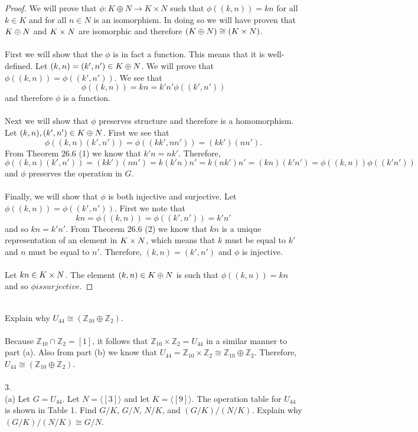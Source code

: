 \documentclass[11pt]{article}
\begin{document}
\begin{proof}
We will prove that $\phi: K \oplus N \rightarrow K \times N$ such that $\phi((k,n)) = kn$ for all $k\in K$ and for all $n\in N$ is an isomorphism. In doing so we will have proven that $K \oplus N$ and $K \times N$ are isomorphic and therefore $ (K \oplus N) \cong (K \times N) $.\\
~\\
First we will show that the $\phi$ is in fact a function. This means that it is well-defined. Let $(k,n) = (k',n') \in K \oplus N$. We will prove that $\phi((k,n)) = \phi((k',n'))$. We see that
\[ \phi((k,n)) = kn = k'n' \phi((k',n')) \]
and therefore $\phi$ is a function.\\
~\\
Next we will show that $\phi$ preserves structure and therefore is a homomorphism. Let $(k,n),(k',n')\in K \oplus N$. First we see that 
\[ \phi((k,n)(k',n')) = \phi((kk',nn')) = (kk')(nn'). \]
From Theorem 26.6 (1) we know that $k'n=nk'$. Therefore,
\[ \phi((k,n)(k',n')) = (kk')(nn') = k(k'n)n' = k(nk')n' = (kn)(k'n') = \phi((k,n))\phi((k'n')) \]
and $\phi$ preserves the operation in $G$.\\
~\\
Finally, we will show that $\phi$ is both injective and surjective. Let $\phi((k,n)) = \phi((k',n'))$. First we note that
\[ kn = \phi((k,n)) = \phi((k',n')) = k'n' \]
and so $kn=k'n'$. From Theorem 26.6 (2) we know that $kn$ is a unique representation of an element in $K \times N$, which means that $k$ must be equal to $k'$ and $n$ must be equal to $n'$. Therefore, $(k,n) = (k',n')$ and $\phi$ is injective.\\
~\\
Let $kn\in K \times N$. The element $(k,n)\in K \oplus N$ is such that $\phi((k,n))=kn$ and so $\phi is surjective$.
\end{proof}
~\\
Explain why $U_{44} \cong (\mathbb{Z}_{10} \oplus \mathbb{Z}_2)$.\\
~\\
Because $\mathbb{Z}_{10} \cap \mathbb{Z}_2 = [1]$, it follows that
 $\mathbb{Z}_{10} \times \mathbb{Z}_2 = U_{44}$ in a similar manner to part (a). Also from part (b) we know that $U_{44} = \mathbb{Z}_{10} \times \mathbb{Z}_2 \cong \mathbb{Z}_{10} \oplus \mathbb{Z}_2$. 
Therefore, $U_{44} \cong (\mathbb{Z}_{10} \oplus \mathbb{Z}_2)$.\\
~\\
3.\\
(a) Let $G= U_{44}$. Let $N = \langle [3] \rangle$ and let $K=\langle [9] \rangle$. The operation table for $U_{44}$ is shown in Table 1. Find $G/K$, $G/N$, $N/K$, and $(G/K)/(N/K)$. Explain why $(G/K)/(N/K) \cong G/N$.
\end{document}
